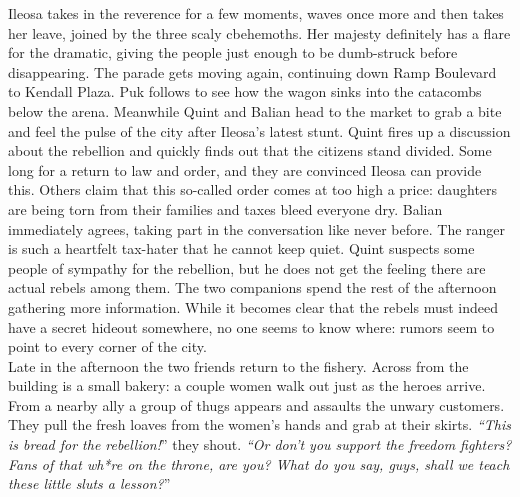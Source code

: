 Ileosa takes in the reverence for a few moments, waves once more and then takes her leave, joined by the three scaly cbehemoths. Her majesty definitely has a flare for the dramatic, giving the people just enough to be dumb-struck before disappearing. The parade gets moving again, continuing down Ramp Boulevard to Kendall Plaza. Puk follows to see how the wagon sinks into the catacombs below the arena. Meanwhile Quint and Balian head to the market to grab a bite and feel the pulse of the city after Ileosa's latest stunt. Quint fires up a discussion about the rebellion and quickly finds out that the citizens stand divided. Some long for a return to law and order, and they are convinced Ileosa can provide this. Others claim that this so-called order comes at too high a price: daughters are being torn from their families and taxes bleed everyone dry. Balian immediately agrees, taking part in the conversation like never before. The ranger is such a heartfelt tax-hater that he cannot keep quiet. Quint suspects some people of sympathy for the rebellion, but he does not get the feeling there are actual rebels among them. The two companions spend the rest of the afternoon gathering more information. While it becomes clear that the rebels must indeed have a secret hideout somewhere, no one seems to know where: rumors seem to point to every corner of the city.\\

Late in the afternoon the two friends return to the fishery. Across from the building is a small bakery: a couple women walk out just as the heroes arrive. From a nearby ally a group of thugs appears and assaults the unwary customers. They pull the fresh loaves from the women's hands and grab at their skirts. {\itshape``This is bread for the rebellion!}'' they shout. {\itshape``Or don't you support the freedom fighters? Fans of that wh*re on the throne, are you? What do you say, guys, shall we teach these little sluts a lesson?}''\\

